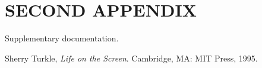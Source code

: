 \documentclass{UCF_ETD}
\begin{document}
\chapter{SECOND APPENDIX}
\newpage

Supplementary documentation.

\backmatter

\begin{thebibliography}{99}

	Sherry Turkle,
	\emph{Life on the Screen}.
	Cambridge, MA: MIT Press,
	1995.

\end{thebibliography}
\end{document}
